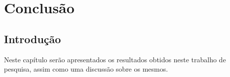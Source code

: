 
\chapter{Conclusão}
\label{cap:conclusão}

\section{Introdução}
Neste capítulo serão apresentados os resultados obtidos neste trabalho de pesquisa, assim como uma discussão sobre os mesmos.
